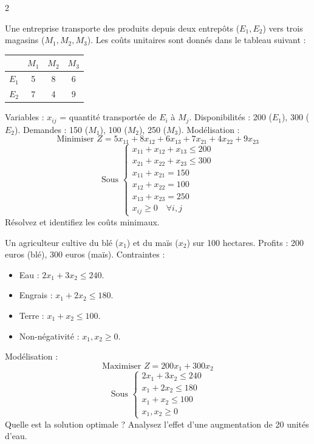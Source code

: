 \begin{multicols}{2}
\begin{exercice}
	Une entreprise transporte des produits depuis deux entrepôts (\(E_1, E_2\)) vers trois magasins (\(M_1, M_2, M_3\)). Les coûts unitaires sont donnés dans le tableau suivant :
	\begin{center}
		\begin{tabular}{c|ccc}
			& \(M_1\) & \(M_2\) & \(M_3\) \\
			\hline
			\(E_1\) & 5 & 8 & 6 \\
			\(E_2\) & 7 & 4 & 9 \\
		\end{tabular}
	\end{center}
	Variables : \(x_{ij}\) = quantité transportée de \(E_i\) à \(M_j\). Disponibilités : 200 (\(E_1\)), 300 (\(E_2\)). Demandes : 150 (\(M_1\)), 100 (\(M_2\)), 250 (\(M_3\)).
	Modélisation :
	\[
	\text{Minimiser } Z = 5x_{11} + 8x_{12} + 6x_{13} + 7x_{21} + 4x_{22} + 9x_{23}
	\]
	\[
	\text{Sous } \begin{cases}
	x_{11} + x_{12} + x_{13} \leq 200 \\
	x_{21} + x_{22} + x_{23} \leq 300 \\
	x_{11} + x_{21} = 150 \\
	x_{12} + x_{22} = 100 \\
	x_{13} + x_{23} = 250 \\
	x_{ij} \geq 0 \quad \forall i,j
	\end{cases}
	\]
	Résolvez et identifiez les coûts minimaux.
\end{exercice}

\begin{exercice}
	Un agriculteur cultive du blé (\(x_1\)) et du maïs (\(x_2\)) sur 100 hectares. Profits : 200 euros (blé), 300 euros (maïs). Contraintes :
	\begin{itemize}
		\item Eau : \(2x_1 + 3x_2 \leq 240\).
		\item Engrais : \(x_1 + 2x_2 \leq 180\).
		\item Terre : \(x_1 + x_2 \leq 100\).
		\item Non-négativité : \(x_1, x_2 \geq 0\).
	\end{itemize}
	Modélisation :
	\[
	\text{Maximiser } Z = 200x_1 + 300x_2
	\]
	\[
	\text{Sous } \begin{cases}
	2x_1 + 3x_2 \leq 240 \\
	x_1 + 2x_2 \leq 180 \\
	x_1 + x_2 \leq 100 \\
	x_1, x_2 \geq 0
	\end{cases}
	\]
	Quelle est la solution optimale ? Analysez l'effet d'une augmentation de 20 unités d'eau.
\end{exercice}


\end{multicols}
